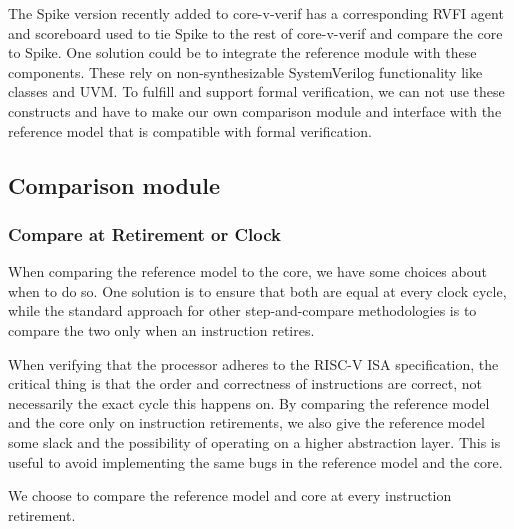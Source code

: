 The Spike version recently added to core-v-verif has a corresponding RVFI agent and scoreboard used to tie Spike to the rest of core-v-verif and compare the core to Spike. One solution could be to integrate the reference module with these components. These rely on non-synthesizable SystemVerilog functionality \cite{mehtaIntroductionSystemVerilog2021} like classes and UVM. To fulfill  and support formal verification, we can not use these constructs and have to make our own comparison module and interface with the reference model that is compatible with formal verification.


\subsection{Comparison module}
\label{sec:des_comparison}

\subsubsection{Compare at Retirement or Clock}
\label{sec:des_retireOrClock}

When comparing the reference model to the core, we have some choices about when to do so. One solution is to ensure that both are equal at every clock cycle, while the standard approach for other step-and-compare methodologies is to compare the two only when an instruction retires.


When verifying that the processor adheres to the RISC-V ISA specification, the critical thing is that the order and correctness of instructions are correct, not necessarily the exact cycle this happens on. By comparing the reference model and the core only on instruction retirements, we also give the reference model some slack and the possibility of operating on a higher abstraction layer. This is useful to avoid implementing the same bugs in the reference model and the core.

We choose to compare the reference model and core at every instruction retirement.

